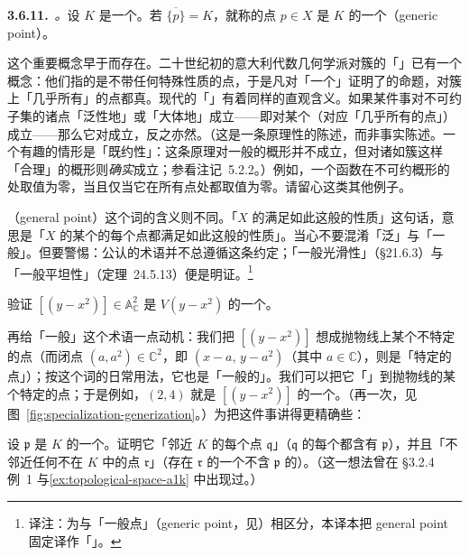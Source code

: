 \textbf{3.6.11.}\ \emph{\trhDefinition{}。}\quad 设 $K$ 是一个\trClosedSubset。若 $\overline{\{p\}}=K$，就称\trTopologicalSpace{}的点 $p\in X$ 是 $K$ 的一个\textbf{\trGenericPoint}（generic point）。

这个重要概念早于\trGrothendieck{}而存在。二十世纪初的意大利代数几何学派对簇的「\trGenericPoint」已有一个概念：他们指的是不带任何特殊性质的点，于是凡对「一个\trGenericPoint」证明了的命题，对簇上「几乎所有」的点都真。现代的「\trGenericPoint」有着同样的直观含义。如果某件事对不可约子集的诸点「泛性地」或「大体地」成立——即对某个\trDense{}\trOpenSubset（对应「几乎所有的点」）成立——那么它对\trGenericPoint{}成立，反之亦然。（这是一条原理性的陈述，而非事实陈述。一个有趣的情形是「既约性」：这条原理对一般的概形并不成立，但对诸如簇这样「合理」的概形则\emph{确实}成立；参看注记~5.2.2。）例如，一个函数在不可约概形的\trGenericPoint{}处取值为零，当且仅当它在所有点处都取值为零。请留心这类其他例子。

\textbf{\trGeneralPoint{}}（general point）这个词的含义则不同。「$X$ 的\trGeneralPoint{}满足如此这般的性质」这句话，意思是「$X$ 的某个\trDense{}\trOpenSubset{}的每个点都满足如此这般的性质」。当心不要混淆「泛」与「一般」。但要警惕：公认的术语并不总遵循这条约定；「一般光滑性」（\S21.6.3）与「一般平坦性」（定理~24.5.13）便是明证。\footnote{译注：为与「一般点」（generic point，见\trGenericPoint）相区分，本译本把 general point 固定译作「\trGeneralPoint{}」。}

\begin{exercise}\label{ex:generic-point-parabola}
验证 $[(y-x^2)]\in\mathbb{A}^2_{\mathbb{C}}$ 是 $V(y-x^2)$ 的一个\trGenericPoint。
\end{exercise}

再给「一般」这个术语一点动机：我们把 $[(y-x^2)]$ 想成抛物线上某个不特定的点（而闭点 $(a,a^2)\in\mathbb{C}^2$，即 $(x-a,\,y-a^2)$（其中 $a\in\mathbb{C}$），则是「特定的点」）；按这个词的日常用法，它也是「一般的」。我们可以把它「\trSpecialization{}」到抛物线的某个特定的点；于是例如，$(2,4)$ 就是 $[(y-x^2)]$ 的一个\trSpecialization{}。（再一次，见图~\ref{fig:specialization-generization}。）为把这件事讲得更精确些：

\begin{exercise}[容易的练习]\label{ex:generic-point-near-every-point}
设 $\mathfrak{p}$ 是\trClosedSubset{} $K$ 的一个\trGenericPoint。证明它「邻近 $K$ 的每个点 $\mathfrak{q}$」（$\mathfrak{q}$ 的每个\trNeighborhood{}都含有 $\mathfrak{p}$），并且「不邻近任何不在 $K$ 中的点 $\mathfrak{r}$」（存在 $\mathfrak{r}$ 的一个不含 $\mathfrak{p}$ 的\trNeighborhood）。（这一想法曾在 \S3.2.4 例~1 与\cref{ex:topological-space-a1k} 中出现过。）
\end{exercise}

